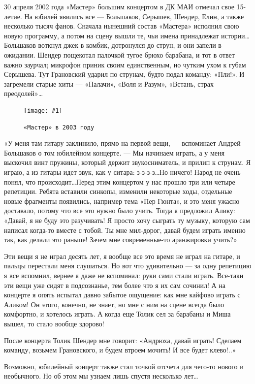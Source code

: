 \documentclass[10pt, twoside]{book}
\newcommand{\myincludegraphics}[1]{\texttt{[image: \#1]}}
\begin{document}
30 апреля 2002 года «Мастер» большим концертом в ДК МАИ отмечал свое 15-летие. На юбилей явились все — Большаков,
Серышев, Шендер, Елин, а также несколько тысяч фанов. Сначала нынешний состав «Мастера» исполнил свою новую программу, а
потом на сцену вышли те, чьи имена принадлежат истории\ldots Большаков воткнул джек в комбик, дотронулся до струн, и они
запели в ожидании. Шендер пощекотал палочкой тугое брюхо барабана, и тот в ответ важно заурчал; микрофон приник своим
единственным, но чутким ухом к губам Серышева. Тут Грановский ударил по струнам, будто подал команду: «Пли!». И
загремели старые хиты — «Палачи», «Воля и Разум», «Встань, страх преодолей»\ldots

\begin{figure}[h]
    \centering
    \myincludegraphics{Image36}
    \caption{\texttt{«Мастер» в 2003 году}}
\end{figure}

«У меня там гитару заклинило, прямо на первой вещи, — вспоминает Андрей Большаков о том юбилейном концерте. — Мы
начинаем играть, а у меня выскочил винт пружины, который держит звукосниматель, и прилип к струнам. Я играю, а из гитары
идет звук, как у ситара: з-з-з-з\ldots Но ничего! Народ не очень понял, что происходит\ldots Перед этим концертом у нас
прошло три или четыре репетиции. Ребята вставили синкопы, изменили некоторые ходы, отдельные новые фрагменты появились,
например тема «Пер Гюнта», и это меня ужасно доставало, потому что все это нужно было учить. Тогда я предложил Алику:
«Давай, я не буду это разучивать! Я просто хочу сыграть ту музыку, которую сам написал когда-то вместе с тобой. Ты мне
мил-дорог, давай будем играть именно так, как делали это раньше! Зачем мне современные-то аранжировки учить?»

Эти вещи я не играл десять лет, я вообще все это время не играл на гитаре, и пальцы перестали меня слушаться. Но вот что
удивительно — за одну репетицию я все вспомнил, вернее я даже не вспоминал: руки сами стали играть. Все-таки эти вещи
уже сидят в подсознанье, тем более что я их сам сочинил! А на концерте я опять испытал давно забытое ощущение: как мне
кайфово играть с Аликом! Он этого, конечно, не знает, но мне с ним на сцене всегда было комфортно, и хотелось играть. А
когда еще Толик сел за барабаны и Миша вышел, то стало вообще здорово!

После концерта Толик Шендер мне говорит: «Андрюха, давай играть! Сделаем команду, возьмем Грановского, и будем втроем
мочить! И все будет клево!..»

Возможно, юбилейный концерт также стал точкой отсчета для чего-то нового и необычного. Но об этом мы узнаем лишь спустя
несколько лет\ldots
\end{document}
